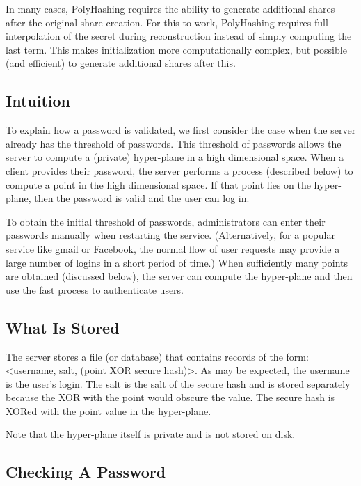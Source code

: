 In many cases, PolyHashing requires the ability to generate additional shares
after the original share creation.   For this to work, PolyHashing requires 
full interpolation of the secret during reconstruction instead of simply
computing the last term.   This makes initialization more computationally
complex, but possible (and efficient) to generate additional shares after this.





\subsection{Intuition}

To explain how a password is validated, we first consider the case when
the server already has the threshold of passwords.   This threshold of
passwords allows the server to compute a (private) hyper-plane in a high 
dimensional space.   When a client provides their password, the server performs
a process (described below) to compute a point in the high dimensional space.
If that point lies on the hyper-plane, then the password is valid and the
user can log in.  

To obtain the initial threshold of passwords, administrators can enter their
passwords manually when restarting the service.   (Alternatively, for a 
popular service like gmail or Facebook, the normal flow of user requests
may provide a large number of logins in a short period of time.)   When
sufficiently many points are obtained (discussed below), the server can 
compute the hyper-plane and then use the fast process to authenticate
users.   

\subsection{What Is Stored}

The server stores a file (or database) that contains records of the form:
<username, salt, (point XOR secure hash)>.   As may be expected, the username 
is the user's login.   The salt is the salt of the secure hash and is stored
separately because the XOR with the point would obscure the value.   The
secure hash is XORed with the point value in the hyper-plane.  

Note that the hyper-plane itself is private and is not stored on disk.   


\subsection{Checking A Password}

